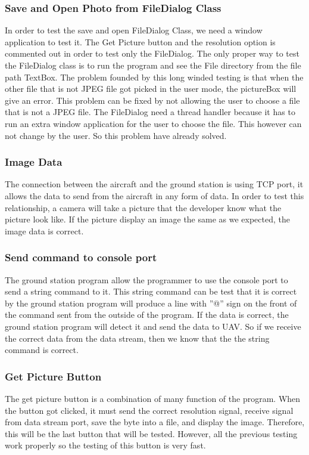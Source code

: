 \documentclass[oneside]{ecsgdp}         %
\begin{document}
\subsubsection*{Save and Open Photo from FileDialog Class}
In order to test the save and open FileDialog Class, we need a window application to test it. The  Get Picture button and the resolution option is commented out in order to test only the FileDialog. The only proper way to test the FileDialog class is to run the program and see the File directory from the file path TextBox. The problem founded by this long winded testing is that when the other file that is not JPEG file got picked in the user mode, the pictureBox will give an error. This problem can be fixed by not allowing the user to choose a file that is not a JPEG file. The FileDialog need a thread handler because it has to run an extra window application for the user to choose the file. This however can not change by the user. So this problem have already solved.
\subsubsection*{Image Data}
The connection between the aircraft and the ground station is using TCP port, it allows the data to send from the aircraft in any form of data. In order to test this relationship, a camera will take a picture that the developer know what the picture look like. If the picture display an image the same as we expected, the image data is correct. 
\subsubsection*{Send command to console port}
The ground station program allow the programmer to use the console port to send a string command to it. This string command can be test that it is correct by the ground station program will produce a line with ''@'' sign on the front of the command sent from the outside of the program.
If the data is correct, the ground station program will detect it and send the data to UAV. So if we receive the correct data from the data stream, then we know that the the string command is correct.
\subsubsection*{Get Picture Button}
The get picture button is a combination of many function of the program. When the button got clicked, it must send the correct resolution signal, receive signal from data stream port, save the byte into a file, and display the image. Therefore, this will be the last button that will be tested. However, all the previous testing work properly so the testing of this button is very fast.
\end{document}
